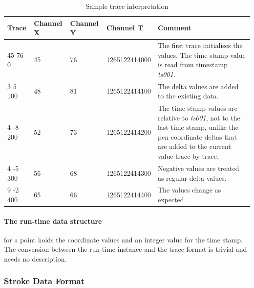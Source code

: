 \begin{table}[htbp]
\begin{center}
  \begin{tabular}{|l||l|l|l|p{200pt}|}
    \hline
    Trace & Channel X & Channel Y & Channel T & Comment \\
    \hline
    45 76 0 & 45 & 76  & 1265122414000 & The first trace initialises 
                                         the values. The time stamp value is
                                         read from timestamp \emph{ts001}. \\
    \hline
    3 5 100 & 48 & 81 &  1265122414100 & The delta values are added to the
                                         existing data. \\
    \hline
    4 -8 200 & 52 & 73 &  1265122414200 & The time stamp values are relative to
                                          \emph{ts001}, not to the last time 
                                          stamp, unlike the pen coordinate 
                                          deltas that are added to the current 
                                          value trace by trace. \\
    \hline
    4 -5 300 & 56 & 68 &  1265122414300 & Negative values are treated as regular
                                          delta values. \\
    \hline
    9 -2 400 & 65 & 66 &  1265122414400 & The values change as expected. \\
    \hline
  \end{tabular}
\end{center}
\caption{Sample trace interpretation}
\label{table:sampletraceinterpretation}
\end{table}

\paragraph{The run-time data structure} for a point holds the coordinate values 
and an integer value for the time stamp. The conversion between the run-time 
instance and the trace format is trivial and needs no description.

\subsubsection{Stroke Data Format}
\label{sec:hwre:strokedataformat}

